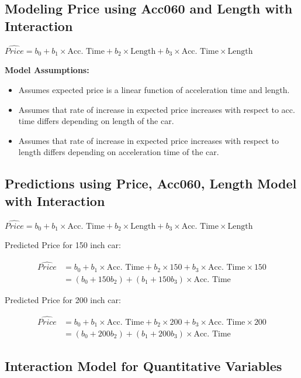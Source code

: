 \documentclass[]{book}
\begin{document}
\subsection{Modeling Price using Acc060 and Length with
Interaction}\label{modeling-price-using-acc060-and-length-with-interaction}

\(\widehat{Price} = b_0 + b_1\times\text{Acc. Time} + b_2\times\text{Length}+ b_3\times\text{Acc. Time}\times\text{Length}\)

\textbf{Model Assumptions:}

\begin{itemize}
\item
  Assumes expected price is a linear function of acceleration time and
  length.
\item
  Assumes that rate of increase in expected price increases with respect
  to acc. time differs depending on length of the car.
\item
  Assumes that rate of increase in expected price increases with respect
  to length differs depending on acceleration time of the car.
\end{itemize}

\subsection{Predictions using Price, Acc060, Length Model with
Interaction}\label{predictions-using-price-acc060-length-model-with-interaction}

\(\widehat{Price} = b_0 + b_1\times\text{Acc. Time} + b_2\times\text{Length} + b_3\times\text{Acc. Time}\times\text{Length}\)

Predicted Price for 150 inch car:

\[
\begin{aligned}
\widehat{Price} & = b_0 + b_1\times\text{Acc. Time} + b_2\times150 + b_3\times\text{Acc. Time}\times150 \\
 &= (b_0 + 150b_2) + (b_1+150b_3)\times\text{Acc. Time}
\end{aligned}
\]

Predicted Price for 200 inch car:

\[
\begin{aligned}
\widehat{Price} & = b_0 + b_1\times\text{Acc. Time} + b_2\times 200 + b_3\times\text{Acc. Time}\times 200 \\
 &= (b_0 + 200b_2) + (b_1+200b_3)\times\text{Acc. Time}
\end{aligned}
\]

\subsection{Interaction Model for Quantitative
Variables}\label{interaction-model-for-quantitative-variables}
\end{document}
